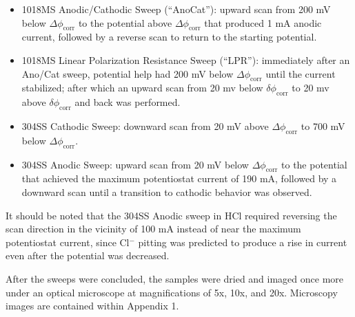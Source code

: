\begin{itemize}

	\item 1018MS Anodic/Cathodic Sweep (``AnoCat''): upward scan from 200 mV below $\Delta \phi_{\text{corr}}$ to the potential above $\Delta \phi_{\text{corr}}$ that produced 1 mA anodic current, followed by a reverse scan to return to the starting potential.
	\item 1018MS Linear Polarization Resistance Sweep (``LPR''): immediately after an Ano/Cat sweep, potential help had 200 mV below $\Delta \phi_{\text{corr}}$ until the current stabilized; after which an upward scan from 20 mv below $\delta \phi_{\text{corr}}$ to 20 mv above $\delta \phi_{\text{corr}}$ and back was performed.
	\item 304SS Cathodic Sweep: downward scan from 20 mV above $\Delta \phi_{\text{corr}}$ to 700 mV below $\Delta \phi_{\text{corr}}$.
	\item 304SS Anodic Sweep: upward scan from 20 mV below $\Delta \phi_{\text{corr}}$ to the potential that achieved the maximum potentiostat current of 190 mA, followed by a downward scan until a transition to cathodic behavior was observed.\cite{labguide}

\end{itemize}

It should be noted that the 304SS Anodic sweep in HCl required reversing the scan direction in the vicinity of 100 mA instead of near the maximum potentiostat current, since Cl$^-$ pitting was predicted to produce a rise in current even after the potential was decreased.\cite{labguide}

After the sweeps were concluded, the samples were dried and imaged once more under an optical microscope at magnifications of 5x, 10x, and 20x.  Microscopy images are contained within Appendix 1.

